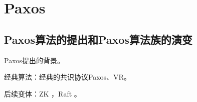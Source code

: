 \chapter{Paxos}

\section{Paxos算法的提出和Paxos算法族的演变}

Paxos提出的背景。

\myleaf 经典算法：经典的共识协议Paxos\cite{Lamport01}、VR\cite{Oki88}。

\myleaf 后续变体：ZK \cite{Junqueira11}，Raft \cite{Ongaro14}。\\


